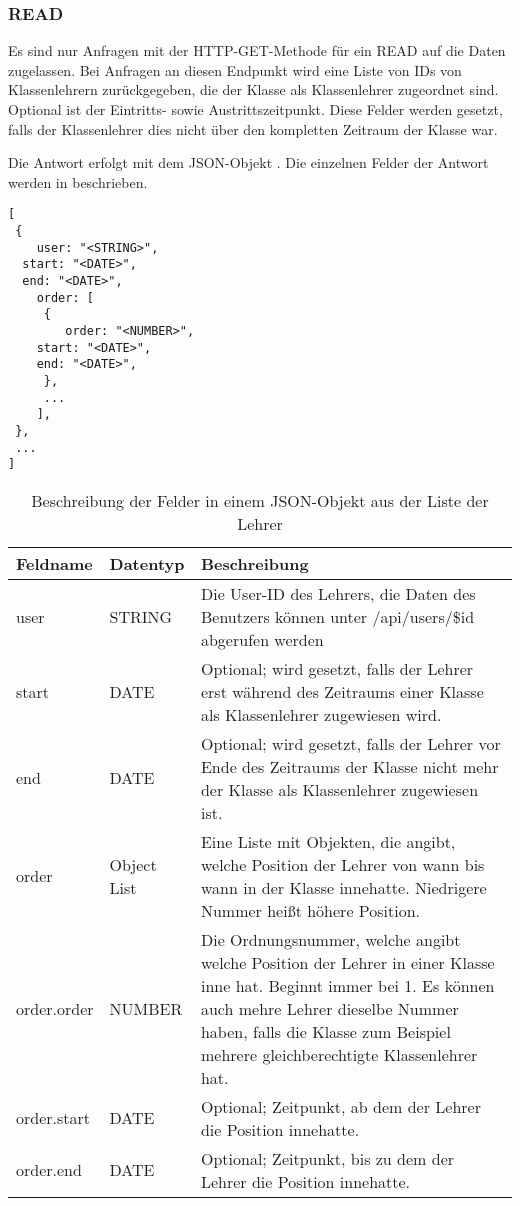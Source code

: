 \subsubsection{READ}
\label{sec:rest:api:classes:id:teachers:read}
Es sind nur Anfragen mit der HTTP-GET-Methode für ein READ auf die Daten zugelassen.
Bei Anfragen an diesen Endpunkt wird eine Liste von IDs von Klassenlehrern zurückgegeben, die der Klasse als Klassenlehrer zugeordnet sind.
Optional ist der Eintritts- sowie Austrittszeitpunkt. Diese Felder werden gesetzt, falls der Klassenlehrer dies nicht über den kompletten Zeitraum der Klasse war.

Die Antwort erfolgt mit dem JSON-Objekt . 
Die einzelnen Felder der Antwort werden in  beschrieben.

\begin{lstlisting}[caption={JSON-Antwort für einen GET-Aufruf des Pfads /api/classes/\$id/teachers},label={lst:code:rest:api:classes:id:teachers:read:ret},frame=tlrb]
[ 
 { 
	user: "<STRING>",
  start: "<DATE>",
  end: "<DATE>",
	order: [
	 {
		order: "<NUMBER>",
    start: "<DATE>",
    end: "<DATE>",
	 },
	 ...
	],
 },
 ... 
]
\end{lstlisting}

\begin{longtable}{|p{}|p{}|p{}|}
		\caption{Beschreibung der Felder in einem JSON-Objekt aus der Liste der Lehrer}
\endfoot
		\caption{Beschreibung der Felder in einem JSON-Objekt aus der Liste der Lehrer}
		\label{tab:rest:api:classes:id:teachers:read:ret}
\endlastfoot 
\hline
			\textbf{Feldname} & \textbf{Datentyp} & \textbf{Beschreibung} \\ \hline
\endhead
user & STRING & Die User-ID des Lehrers, die Daten des Benutzers können unter /api/users/\$id abgerufen werden  \\ \hline
start & DATE & Optional; wird gesetzt, falls der Lehrer erst während des Zeitraums einer Klasse als Klassenlehrer zugewiesen wird. \\ \hline
end & DATE & Optional; wird gesetzt, falls der Lehrer vor Ende des Zeitraums der Klasse nicht mehr der Klasse als Klassenlehrer zugewiesen ist. \\ \hline
order & Object List & Eine Liste mit Objekten, die angibt, welche Position der Lehrer von wann bis wann in der Klasse innehatte. Niedrigere Nummer heißt höhere Position. \\ \hline
order.order & NUMBER & Die Ordnungsnummer, welche angibt welche Position der Lehrer in einer Klasse inne hat. Beginnt immer bei 1. Es können auch mehre Lehrer dieselbe Nummer haben, falls die Klasse zum Beispiel mehrere gleichberechtigte Klassenlehrer hat. \\ \hline
order.start & DATE & Optional; Zeitpunkt, ab dem der Lehrer die Position innehatte. \\ \hline
order.end & DATE & Optional; Zeitpunkt, bis zu dem der Lehrer die Position innehatte. \\ \hline
\end{longtable}
